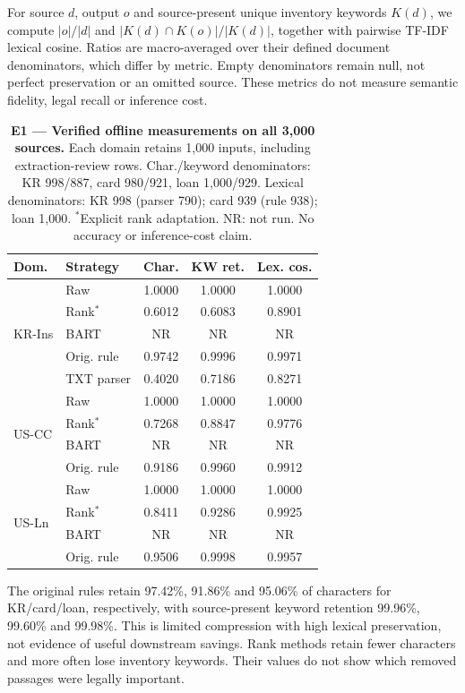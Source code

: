 \documentclass[11pt]{article}
\begin{document}
For source $d$, output $o$ and source-present unique inventory keywords
$K(d)$, we compute $|o|/|d|$ and
$|K(d)\cap K(o)|/|K(d)|$, together with pairwise TF-IDF lexical cosine.
Ratios are macro-averaged over their defined document denominators, which
differ by metric. Empty denominators remain null, not perfect preservation
or an omitted source. These metrics do not measure semantic fidelity,
legal recall or inference cost.
\begin{table}[t]
\centering\small\setlength{\tabcolsep}{2.5pt}


\begin{tabular}{llccc}
\toprule
Dom. & Strategy & Char. & KW ret. & Lex. cos. \\
\midrule
\multirow{5}{*}{KR-Ins}
  & Raw           & 1.0000 & 1.0000 & 1.0000 \\
  & Rank$^{*}$    & 0.6012 & 0.6083 & 0.8901 \\
  & BART          & NR     & NR     & NR     \\
  & Orig. rule    & 0.9742 & 0.9996 & 0.9971 \\
  & TXT parser    & 0.4020 & 0.7186 & 0.8271 \\
\midrule
\multirow{4}{*}{US-CC}
  & Raw           & 1.0000 & 1.0000 & 1.0000 \\
  & Rank$^{*}$    & 0.7268 & 0.8847 & 0.9776 \\
  & BART          & NR     & NR     & NR     \\
  & Orig. rule    & 0.9186 & 0.9960 & 0.9912 \\
\midrule
\multirow{4}{*}{US-Ln}
  & Raw           & 1.0000 & 1.0000 & 1.0000 \\
  & Rank$^{*}$    & 0.8411 & 0.9286 & 0.9925 \\
  & BART          & NR     & NR     & NR     \\
  & Orig. rule    & 0.9506 & 0.9998 & 0.9957 \\
\bottomrule
\end{tabular}
\caption{\textbf{E1 --- Verified offline measurements on all 3,000 sources.}
Each domain retains 1,000 inputs, including extraction-review rows.
Char./keyword denominators: KR 998/887, card 980/921, loan 1,000/929.
Lexical denominators: KR 998 (parser 790); card 939 (rule 938); loan 1,000.
$^{*}$Explicit rank adaptation. NR: not run. No accuracy or inference-cost claim.}
\label{tab:e1}
\end{table}

The original rules retain 97.42\%, 91.86\% and 95.06\% of characters
for KR/card/loan, respectively, with source-present keyword retention
99.96\%, 99.60\% and 99.98\%. This is limited compression with high
lexical preservation, not evidence of useful downstream savings.
Rank methods retain fewer characters and more often lose inventory
keywords. Their values do not show which removed passages were legally
important.
\end{document}
